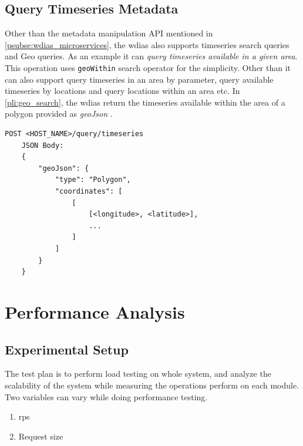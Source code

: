 \documentclass[conference]{IEEEtran}
\begin{document}
\subsection{Query Timeseries Metadata}
\label{psubse:query_timeseries}

Other than the metadata manipulation API mentioned in \cref{psubse:wdias_microservices}, the \acrshort{wdias} also supports timeseries search queries and Geo queries. As an example it can \emph{query timeseries available in a given area}. This operation uses \texttt{geoWithin} search operator for the simplicity. Other than it can also support query timeseries in an area by parameter, query available timeseries by locations and query locations within an area etc. In \cref{pli:geo_search}, the \acrshort{wdias} return the timeseries available within the area of a polygon provided as \emph{geoJson} \cite{InternetEngineeringTaskForceGeoJSON}.

\begin{lstlisting}[caption=Geo search timeseries, label=pli:geo_search]
    POST <HOST_NAME>/query/timeseries
    JSON Body:
    {
        "geoJson": {
            "type": "Polygon",
            "coordinates": [
                [
                    [<longitude>, <latitude>],
                    ...
                ]
            ]
        }
    }
\end{lstlisting}

\section{Performance Analysis}
\label{pse:performance_analysis}

\subsection{Experimental Setup}
\label{psubse:experimental_setup}

The test plan is to perform load testing on whole system, and analyze the scalability of the system while measuring the operations perform on each module. Two variables can vary while doing performance testing.
\begin{enumerate}
    \item \acrfull{rps}
    \item Request size
\end{enumerate}
\end{document}
